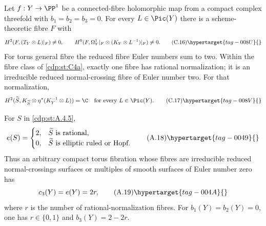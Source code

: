 
\begin{proposition}\hypertarget{tag-01FL}{}\label{cdp:st:C4b}


Let $f:Y\to\PP^1$ be a connected-fibre holomorphic map from a compact complex threefold with $b_1=b_2=b_3=0$. For every $L\in\Pic(Y)$ there is a scheme-theoretic fibre $F$ with
\[
 H^2(F,(T_Y\otimes L)|_F)\ne0,\qquad
 H^0(F,\Omega_Y^1|_F\otimes(K_Y\otimes L^{-1})|_F)\ne0. \tag{C.16}\hypertarget{tag-008U}{}\label{cdp:eq:C.16}
\]
For torus general fibre the reduced fibre Euler numbers sum to two. Within the fibre class of \ref{cdp:st:C4a}, exactly one fibre has rational normalization; it is an irreducible reduced normal-crossing fibre of Euler number two. For that normalization,
\[
H^2(\widetilde S,K_{\widetilde S}\otimes
             \eta^*(K_Y^{-1}\otimes L))=\C
\quad\hbox{for every }L\in\Pic(Y).                    \tag{C.17}\hypertarget{tag-008V}{}\label{cdp:eq:C.17}
\]
\end{proposition}

\begin{proposition}\hypertarget{tag-01AV}{}\label{cdp:st:A.4.6}


For $S$ in \ref{cdp:st:A.4.5},
\[
e(S)=\begin{cases}
2,&\widetilde S\text{ is rational},\\
0,&\widetilde S\text{ is elliptic ruled or Hopf}.
\end{cases}
\tag{A.18}\hypertarget{tag-0049}{}\label{cdp:eq:A.18}
\]
Thus an arbitrary compact torus fibration whose fibres are irreducible reduced normal-crossings surfaces or multiples of smooth surfaces of Euler number zero has
\[
c_3(Y)=e(Y)=2r,
\tag{A.19}\hypertarget{tag-004A}{}\label{cdp:eq:A.19}
\]
where $r$ is the number of rational-normalization fibres. For $b_1(Y)=b_2(Y)=0$, one has $r\in\{0,1\}$ and $b_3(Y)=2-2r$.
\end{proposition}

